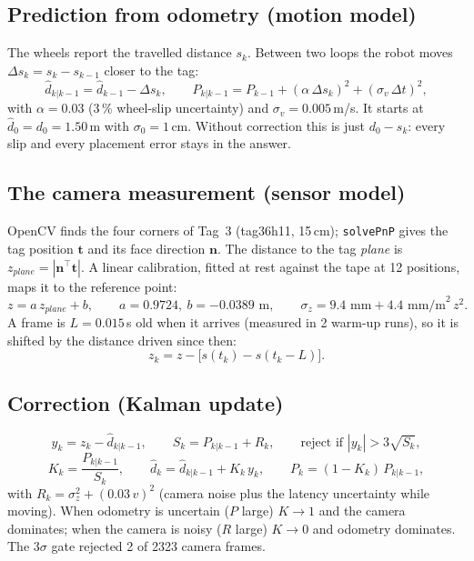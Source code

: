 \documentclass[11pt,a4paper]{article}
\begin{document}
\subsection*{Prediction from odometry (motion model)}
The wheels report the travelled distance $s_k$. Between two loops the robot moves $\Delta s_k=s_k-s_{k-1}$ closer to the tag:
\begin{equation}\label{eq:pred}
\hat d_{k|k-1}=\hat d_{k-1}-\Delta s_k,\qquad P_{k|k-1}=P_{k-1}+(\alpha\,\Delta s_k)^2+(\sigma_v\,\Delta t)^2,
\end{equation}
with $\alpha=0.03$ (3\,\% wheel-slip uncertainty) and $\sigma_v=0.005$\,m/s. It starts at $\hat d_0=d_0=1.50$\,m with $\sigma_0=1$\,cm. Without correction this is just $d_0-s_k$: every slip and every placement error stays in the answer.

\subsection*{The camera measurement (sensor model)}
OpenCV finds the four corners of Tag~3 (tag36h11, 15\,cm); \texttt{solvePnP} gives the tag position $\mathbf t$ and its face direction $\mathbf n$. The distance to the tag \emph{plane} is $z_{plane}=|\mathbf n^\top\mathbf t|$. A linear calibration, fitted at rest against the tape at 12 positions, maps it to the reference point:
\begin{equation}\label{eq:cal}
z=a\,z_{plane}+b,\qquad a=0.9724,\ b=-0.0389\text{ m},\qquad \sigma_z=9.4\text{ mm}+4.4\text{ mm/m}^2\,z^2 .
\end{equation}
A frame is $L=0.015$\,s old when it arrives (measured in 2 warm-up runs), so it is shifted by the distance driven since then:
\begin{equation}\label{eq:lat}
z_k=z-\big[s(t_k)-s(t_k-L)\big].
\end{equation}

\subsection*{Correction (Kalman update)}
\begin{equation}\label{eq:gate}
y_k=z_k-\hat d_{k|k-1},\qquad S_k=P_{k|k-1}+R_k,\qquad \text{reject if } |y_k|>3\sqrt{S_k},
\end{equation}
\begin{equation}\label{eq:upd}
K_k=\frac{P_{k|k-1}}{S_k},\qquad \hat d_k=\hat d_{k|k-1}+K_k\,y_k,\qquad P_k=(1-K_k)\,P_{k|k-1},
\end{equation}
with $R_k=\sigma_z^2+(0.03\,v)^2$ (camera noise plus the latency uncertainty while moving). When odometry is uncertain ($P$ large) $K\to1$ and the camera dominates; when the camera is noisy ($R$ large) $K\to0$ and odometry dominates. The 3$\sigma$ gate rejected 2 of 2323 camera frames.
\end{document}

